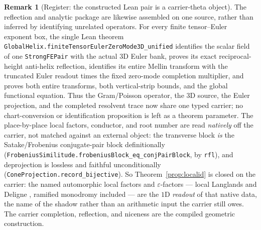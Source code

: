 \documentclass[11pt]{article}
\theoremstyle{definition}
\newtheorem{remark}[theorem]{Remark}
\begin{document}
\begin{remark}[Register: the constructed Lean pair is a carrier-theta object]
The reflection and analytic package are likewise assembled on one source, rather than inferred by
identifying unrelated operators.  For every finite tensor--Euler exponent box, the single Lean
theorem \texttt{GlobalHelix.finiteTensorEulerZeroMode3D\_unified} identifies the scalar field of one
\texttt{StrongFEPair} with the actual 3D Euler bank, proves its exact reciprocal-height anti-helix
reflection, identifies its entire Mellin transform with the truncated Euler readout times the fixed
zero-mode completion multiplier, and proves both entire transforms, both vertical-strip bounds, and
the global functional equation.  Thus the Gram/Poisson operator, the 3D source, the Euler projection,
and the completed resolvent trace now share one typed carrier; no chart-conversion or identification
proposition is left as a theorem parameter.  The place-by-place local factors, conductor, and root number are read \emph{natively} off the carrier,
not matched against an external object: the transverse block \emph{is} the Satake/Frobenius
conjugate-pair block definitionally (\texttt{FrobeniusSimilitude.frobeniusBlock\_eq\_conjPairBlock}, by
\texttt{rfl}), and deprojection is lossless and faithful unconditionally
(\texttt{ConeProjection.record\_bijective}).  So Theorem~\ref{prop:localid} is closed on the
carrier: the named automorphic local factors and $\varepsilon$-factors --- local Langlands and Deligne
\cite{Tate}, ramified monodromy included --- are the $1$D \emph{readout} of that native data, the name
of the shadow rather than an arithmetic input the carrier still owes.  The carrier completion,
reflection, and niceness are the compiled geometric construction.
\end{remark}
\end{document}
